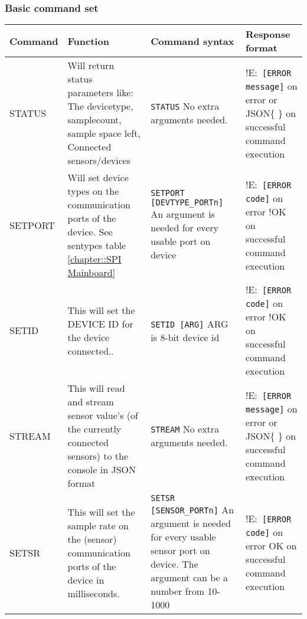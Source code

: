 \subsubsection{Basic command set}
\begin{longtable} {|m{5em}|m{15em}|m{12.2em}|m{14em}|}
\hline
    Command  & Function & Command syntax & Response format \\
   \hline
   STATUS & Will return status parameters like: The devicetype, samplecount, sample space left,  Connected sensors/devices & \texttt{STATUS} \newline No extra arguments needed. & !E:\texttt{ [ERROR message]} on error \newline or JSON\{ \} on successful \newline command execution\\          \hline
  SETPORT & Will set device types on the \newline communication ports of the device. See sentypes table \ref{chapter::SPI Mainboard} & \texttt{SETPORT [DEVTYPE\_PORTn]} An argument is needed for every usable port on device& !E:\texttt{ [ERROR code]} on error \newline !OK on successful \newline command execution \\ \hline
  SETID   & This will set the DEVICE ID for the device connected.. & \texttt{SETID [ARG]} \newline ARG is 8-bit device id & !E:\texttt{ [ERROR code]} on error \newline !OK on successful \newline command execution\\ \hline
  STREAM & This will read and stream sensor \newline value's (of the currently connected sensors) to the console in JSON format & \texttt{STREAM} \newline No extra arguments needed. & !E:\texttt{ [ERROR message]} on error \newline or JSON\{ \} on successful \newline command execution\\ \hline
  SETSR & This will set the sample rate on the \newline (sensor) communication ports of the device in milliseconds. & \texttt{SETSR [SENSOR\_PORTn]} \newline An argument is needed for every usable sensor port on device. \newline The argument can be \newline a number from 10-1000 & !E:\texttt{ [ERROR code]} on error \newline OK on successful \newline command execution \\ \hline

\end{longtable}
